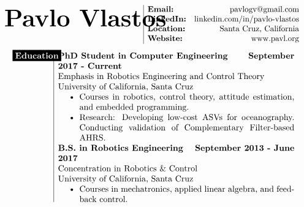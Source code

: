 \documentclass[paper=a4,fontsize=10pt]{article} %
\def \nameColWidth {0.5\textwidth}		%
\def \mainColWidth {0.8\textwidth}		%
\def \leftColWidth {0.125\textwidth}		%
\begin{document}
\begin{align*}
	\parbox[t]{\nameColWidth}{%
		\text{\fontsize{30}{36}\selectfont \textbf{Pavlo Vlastos}}
	}%
	&
	\begin{array}{|lr}
		\textbf{Email:} & \text{pavlogv@gmail.com}\\
		\textbf{LinkedIn:} & \text{linkedin.com/in/pavlo-vlastos}\\
		\textbf{Location:} & \text{Santa Cruz, California}\\
		\textbf{Website:} & \text{www.pavl.org}
	\end{array}
\end{align*}
\begin{align*}
	\begin{array}[t]{l}
	\parbox[t]{\leftColWidth}{%
	\colorbox{black}{\color{white}{\textbf{Education}}}
	}%
	\end{array}
	&
	\begin{array}[t]{|l}
		\parbox[t]{\mainColWidth}{%
			\textbf{PhD Student in Computer Engineering} \hfill \textbf{September 2017 - Current} \\
			Emphasis in Robotics Engineering and Control Theory\\
			University of California, Santa Cruz
			\begin{itemize}[noitemsep,topsep=0pt]
			\item Courses in robotics, control theory, attitude estimation, and embedded programming.
			\item Research: Developing low-cost ASVs for oceanography. Conducting validation of Complementary Filter-based AHRS.
			\end{itemize}
			\textbf{B.S. in Robotics Engineering} \hfill \textbf{September 2013 - June 2017}\\
			Concentration in Robotics \& Control\\
			University of California, Santa Cruz
			\begin{itemize}[noitemsep,topsep=0pt]
			\item Courses in mechatronics, applied linear algebra, and feedback control.
			\end{itemize}
		}%
	\end{array}
\end{align*}
\end{document}
